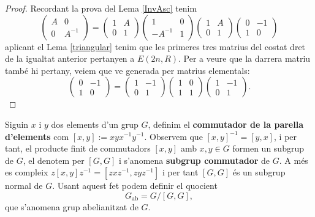 \begin{proof}
Recordant la prova del Lema \ref{InvAsc} tenim 
\begin{equation}
\left( \begin{matrix}
  A & 0 \\
  0 & A^{-1}
 \end{matrix} \right)
 =
 \left( \begin{matrix}
  1 & A \\
  0 & 1
 \end{matrix} \right)
 \left( \begin{matrix}
  1 & 0 \\
  -A^{-1} & 1
 \end{matrix} \right)
\left( \begin{matrix}
  1 & A \\
  0 & 1
 \end{matrix} \right)
\left( \begin{matrix}
  0 & -1 \\
  1 & 0
 \end{matrix} \right) 
\end{equation}
aplicant el Lema \ref{triangular} tenim que les primeres tres matrius del costat dret de la igualtat anterior pertanyen a $E(2n,R)$. Per a veure que la darrera matriu també hi pertany, veiem que ve generada per matrius elementals:
$$
 \left( \begin{matrix}
  0 & -1 \\
  1 & 0
 \end{matrix} \right)
 =
 \left( \begin{matrix}
  1 & -1 \\
  0 & 1
 \end{matrix} \right)
\left( \begin{matrix}
  1 & 0 \\
  1 & 1
 \end{matrix} \right)
\left( \begin{matrix}
  1 & -1 \\
  0 & 1
 \end{matrix} \right) .
$$
\end{proof}


\begin{definition}
Siguin $x$ i $y$ dos elements d'un grup $G$, definim el \textbf{commutador de la parella d'elements} com $[x,y]:=xyx^{-1}y^{-1}$. Observem que $[x,y]^{-1}=[y,x]$, i per tant, el producte finit de commutadors $[x,y]$ amb $x,y \in G$ formen un subgrup de $G$, el denotem per $[G,G]$ i s'anomena \textbf{subgrup commutador} de $G$. A més es compleix $z[x,y]z^{-1}=[zxz^{-1},zyz^{-1}]$ i per tant $[G,G]$ és un subgrup normal de $G$. Usant aquest fet podem definir el quocient 
$$
G_{\text{ab}} = G/[G,G],
$$
que s'anomena grup abelianitzat de $G$.
\end{definition}

